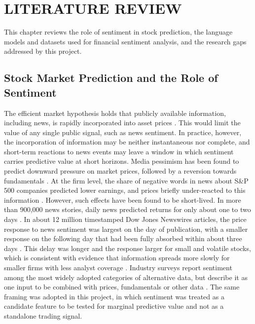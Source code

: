 \chapter{LITERATURE REVIEW}

This chapter reviews the role of sentiment in stock prediction, the language models and datasets used for financial sentiment analysis, and the research gaps addressed by this project.

\section{Stock Market Prediction and the Role of Sentiment}
The efficient market hypothesis holds that publicly available information, including news, is rapidly incorporated into asset prices \parencite{fama1970efficient}. This would limit the value of any single public signal, such as news sentiment. In practice, however, the incorporation of information may be neither instantaneous nor complete, and short-term reactions to news events may leave a window in which sentiment carries predictive value at short horizons. Media pessimism has been found to predict downward pressure on market prices, followed by a reversion towards fundamentals \parencite{tetlock2007giving}. At the firm level, the share of negative words in news about S\&P 500 companies predicted lower earnings, and prices briefly under-reacted to this information \parencite{tetlock2008more}. However, such effects have been found to be short-lived. In more than 900,000 news stories, daily news predicted returns for only about one to two days \parencite{heston2017news}. In about 12 million timestamped Dow Jones Newswires articles, the price response to news sentiment was largest on the day of publication, with a smaller response on the following day that had been fully absorbed within about three days \parencite{ke2019predicting}. This delay was longer and the response larger for small and volatile stocks, which is consistent with evidence that information spreads more slowly for smaller firms with less analyst coverage \parencite{hong2000bad}.
Industry surveys report sentiment among the most widely adopted categories of alternative data, but describe it as one input to be combined with prices, fundamentals or other data \parencite{aima2024casting}. The same framing was adopted in this project, in which sentiment was treated as a candidate feature to be tested for marginal predictive value and not as a standalone trading signal.

